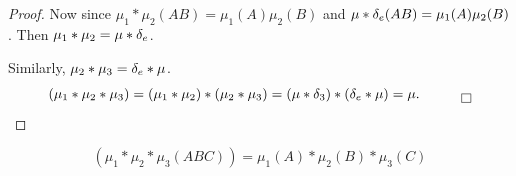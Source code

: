 \begin{proof}
Now since $\mu_1 * \mu_2(AB) = \mu_1(A) \mu_2(B)$ and $\mu * \delta_e(AB) = \mu_1(A) \mu_2(B)$.  Then $\mu_1 * \mu_2 = \mu * \delta_e$.

Similarly, $\mu_2 * \mu_3 = \delta_e * \mu$.
\[
  (\mu_1 * \mu_2 * \mu_3) = (\mu_1 * \mu_2) * (\mu_2 * \mu_3)
       = (\mu * \dl_3) * (\dl_e * \mu) = \mu.
\quad \qed
\]
\end{proof}

\[
     (\mu_1 * \mu_2 * \mu_3(ABC)) = \mu_1(A) * \mu_2(B) * \mu_3(C)
\]
